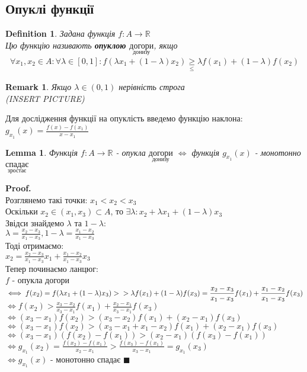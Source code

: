 \documentclass[a4paper, 14pt]{extarticle}
\def\huge{\displaystyle}
\theoremstyle{theoremdd}
\theoremstyle{theoremdd}
\newtheorem{definition}[theorem]{Definition}
\theoremstyle{theoremdd}
\theoremstyle{theoremdd}
\theoremstyle{theoremdd}
\theoremstyle{theoremdd}
\newtheorem{remark}[theorem]{Remark}
\theoremstyle{theoremdd}
\newtheorem{lemma}[theorem]{Lemma}
\theoremstyle{theoremdd}
\newenvironment{pf}{\vspace*{-3mm} \textbf{Proof. \\}}{$\blacksquare$}
\begin{document}
\subsection{Опуклі функції}
\begin{definition}
Задана функція $f: A \to \mathbb{R}$\\
Цю функцію називають \textbf{опуклою $\underset{\textrm{донизу}}{\textrm{догори}}$}, якщо
\begin{align*}
\forall x_1,x_2 \in A: \forall \lambda \in [0,1]: f(\lambda x_1 + (1-\lambda)x_2) \underset{\leq}{\geq} \lambda f(x_1) + (1-\lambda)f(x_2)
\end{align*}
\end{definition}

\begin{remark}
Якщо $\lambda \in (0,1)$ нерівність строга\\
(INSERT PICTURE)
\end{remark}

Для дослідження функції на опуклість введемо функцію наклона: \\ $g_{x_1}(x) = \huge \frac{f(x)-f(x_1)}{x-x_1}$

\begin{lemma} Функція $f: A \to \mathbb{R}$ - опукла $\underset{\textrm{донизу}}{\textrm{догори}}$ $\iff$ функція $g_{x_1}(x)$ - монотонно $\underset{\textrm{зростає}}{\textrm{спадає}}$
\end{lemma}
\begin{pf}
Розглянемо такі точки: $x_1<x_2<x_3$\\
Оскільки $x_2 \in (x_1,x_3) \subset A$, то $\exists \lambda: x_2 + \lambda x_1 + (1-\lambda)x_3$\\
Звідси знайдемо $\lambda$ та $1-\lambda$:\\
$\huge \lambda = \frac{x_2-x_3}{x_1-x_3}, 1-\lambda = \frac{x_1-x_2}{x_1-x_3}$\\
Тоді отримаємо:\\
$x_2 = \huge \frac{x_2-x_3}{x_1-x_3}x_1 + \frac{x_1-x_2}{x_1-x_3}x_3$\\
Тепер починаємо ланцюг:\\
$f$ - опукла догори $\iff f(x_2) = \huge f(\lambda x_1 + (1-\lambda)x_3) > \\ > \lambda f(x_1) + (1-\lambda)f(x_3) = \frac{x_2-x_3}{x_1-x_3}f(x_1)+\frac{x_1-x_2}{x_1-x_3}f(x_3)$\\
$\iff \huge f(x_2) > \frac{x_3-x_2}{x_3-x_1}f(x_1)+\frac{x_2-x_1}{x_3-x_1}f(x_3)$\\
$\iff (x_3-x_1)f(x_2) > (x_3-x_2)f(x_1)+(x_2-x_1)f(x_3)$\\
$\iff (x_3-x_1)f(x_2) > (x_3-x_1+x_1-x_2)f(x_1)+(x_2-x_1)f(x_3)$\\
$\iff (x_3-x_1)(f(x_2)-f(x_1)) > (x_2-x_1)(f(x_3)-f(x_1))$\\
$\iff \huge g_{x_1}(x_2) = \frac{f(x_2)-f(x_1)}{x_2-x_1} > \frac{f(x_3)-f(x_1)}{x_3-x_1} = g_{x_1}(x_3)$\\
$\iff g_{x_1}(x)$ - монотонно спадає
\end{pf}
\end{document}
